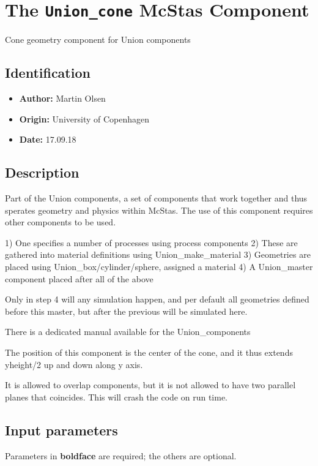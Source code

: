 \section{The \texttt{Union\_cone} McStas Component}
Cone geometry component for Union components

\subsection*{Identification}
\begin{itemize}
  \item \textbf{Author:} Martin Olsen
  \item \textbf{Origin:} University of Copenhagen
  \item \textbf{Date:} 17.09.18
\end{itemize}

\subsection*{Description}
Part of the Union components, a set of components that work together and thus sperates geometry and physics within McStas. The use of this component requires other components to be used.

1) One specifies a number of processes using process components 2) These are gathered into material definitions using Union\_make\_material 3) Geometries are placed using Union\_box/cylinder/sphere, assigned a material 4) A Union\_master component placed after all of the above

Only in step 4 will any simulation happen, and per default all geometries defined before this master, but after the previous will be simulated here.

There is a dedicated manual available for the Union\_components

The position of this component is the center of the cone, and it thus extends yheight/2 up and down along y axis.

It is allowed to overlap components, but it is not allowed to have two parallel planes that coincides. This will crash the code on run time.

\subsection*{Input parameters}
Parameters in \textbf{boldface} are required; the others are optional.

